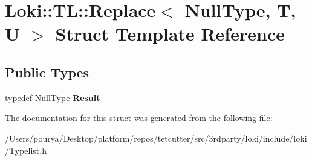 \hypertarget{structLoki_1_1TL_1_1Replace_3_01NullType_00_01T_00_01U_01_4}{}\section{Loki\+:\+:T\+L\+:\+:Replace$<$ Null\+Type, T, U $>$ Struct Template Reference}
\label{structLoki_1_1TL_1_1Replace_3_01NullType_00_01T_00_01U_01_4}
\subsection*{Public Types}
\begin{DoxyCompactItemize}
\item 
\hypertarget{structLoki_1_1TL_1_1Replace_3_01NullType_00_01T_00_01U_01_4_a9611fe4767ed24c4965ef4729ca05756}{}typedef \hyperlink{classLoki_1_1NullType}{Null\+Type} {\bfseries Result}\label{structLoki_1_1TL_1_1Replace_3_01NullType_00_01T_00_01U_01_4_a9611fe4767ed24c4965ef4729ca05756}

\end{DoxyCompactItemize}


The documentation for this struct was generated from the following file\+:\begin{DoxyCompactItemize}
\item 
/\+Users/pourya/\+Desktop/platform/repos/tetcutter/src/3rdparty/loki/include/loki/Typelist.\+h\end{DoxyCompactItemize}

